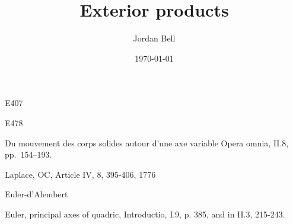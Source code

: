 \documentclass{amsart}
\theoremstyle{definition}
\begin{document}
\title{Exterior products}
\author{Jordan Bell}
\address{Department of Mathematics, University of Toronto, Toronto, Ontario, Canada}
\date{\today}
\maketitle









E407

E478

Du mouvement des corps solides autour d'une axe variable
Opera omnia, II.8, pp.~154--193.


Laplace, OC, Article IV, 8, 395-406, 1776

Euler-d'Alembert

Euler, principal axes of quadric, Introductio, I.9, p. 385,
and in II.3, 215-243.



\end{document}

